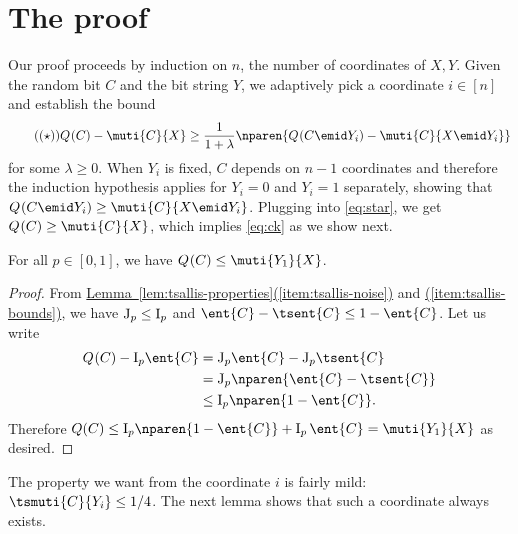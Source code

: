 
\section{The proof}
\label{sec:proof}
Our proof proceeds by induction on $n$, the number of
coordinates of $X,Y$. Given the random bit $C$ and the
bit string $Y\!$, we adaptively pick a coordinate $i\in[n]$ and
establish the bound
\begin{align}
  \tag{($\star$)}\label{eq:star}
  \qent{C} - \muti{C}{X} \ge \frac{1}{1+ \lambda}
  \nparen{\qent{C\emid Y_i}-\muti{C}{X\emid Y_i}}
\end{align}
for some $\lambda\ge 0$.
When $Y_i$ is fixed, $C$ depends on $n-1$ coordinates and
therefore the induction hypothesis applies for $Y_i=0$ and
$Y_i=1$ separately, showing that
$\qent{C\emid Y_i}\ge \muti{C}{X\emid Y_i}$.
Plugging into \eqref{eq:star}, we get
$\qent{C}\ge\muti{C}{X}$, which implies \eqref{eq:ck}
as we show next.
\begin{lemma}
\label{lem:ck+to_ck}
For all $p\in[0,1]$, we have
$\qent{C}\le \muti{Y_1}{X}$.
\end{lemma}
\begin{proof}
From \hyperref[item:tsallis-noise]{Lemma~\ref*{lem:tsallis-properties}(\ref*{item:tsallis-noise})}
and \hyperref[item:tsallis-bounds]{(\ref*{item:tsallis-bounds})},
we have $\mathrm{J}_p\le\mathrm{I}_p$ and
$\ent{C}-\tsent{C}\le1-\ent{C}$. Let us write
\begin{align*}
  \qent{C} - \sI\ent{C}
  &= \qJ\ent{C} - \qJ\tsent{C}\\
  &=   \qJ\nparen{\ent{C}-\tsent{C}}\\
  &\le \sI \nparen{1-\ent{C}}.
\end{align*}
Therefore
$\Q\le \sI\nparen{1-\ent{C}} + \sI\,\ent{C} = \muti{Y_1}{X}$
as desired.
\end{proof}
The property we want from the coordinate $i$ is fairly mild:
$\tsmuti{C}{Y_i}\le 1/4$. The next lemma shows that such a
coordinate always exists.

